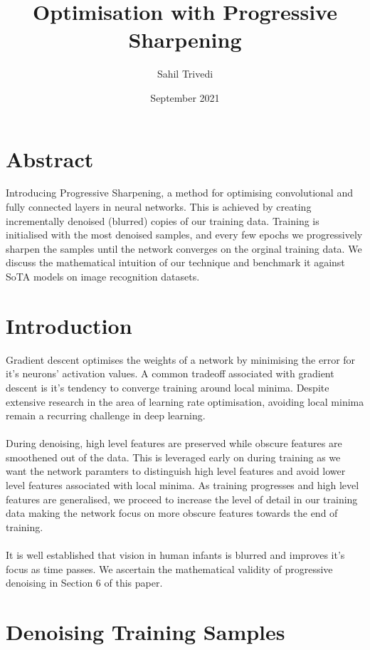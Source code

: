 \documentclass[12pt]{article}
\date{September 2021}
\title{Optimisation with Progressive Sharpening}
\author{Sahil Trivedi}
\begin{document}
	\maketitle
	
	\begin{multicols}{2}
		\section{Abstract}
		Introducing Progressive Sharpening, a method for optimising convolutional and fully connected layers in neural networks. This is achieved by creating incrementally denoised (blurred) copies of our training data. Training is initialised with the most denoised samples, and every few epochs we progressively sharpen the samples until the network converges on the orginal training data. We discuss the mathematical intuition of our technique and benchmark it against SoTA models on image recognition datasets. 
		
		\section{Introduction}
		Gradient descent optimises the weights of a network by minimising the error for it's neurons' activation values. A common tradeoff associated with gradient descent is it's tendency to converge training around local minima. Despite extensive research in the area of learning rate optimisation, avoiding local minima remain a recurring challenge in deep learning.
		\\\\
		During denoising, high level features are preserved while obscure features are smoothened out of the data. This is leveraged early on during training as we want the network paramters to distinguish high level features and avoid lower level features associated with local minima. As training progresses and high level features are generalised, we proceed to increase the level of detail in our training data making the network focus on more obscure features towards the end of training.
		\\\\
		It is well established that vision in human infants is blurred and improves it's focus as time passes. We ascertain the mathematical validity of progressive denoising in Section 6 of this paper.  
		
		\section{Denoising Training Samples}
		

\end{multicols}
\end{document}
